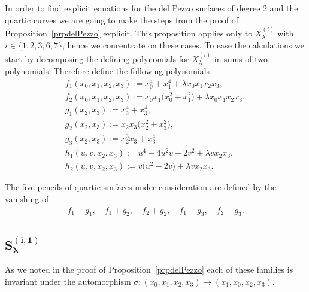 \documentclass[pdftex]{sigma}
\numberwithin{equation}{section}
\begin{document}
In order to f\/ind explicit equations for the del Pezzo surfaces of degree 2 and the quartic curves we are going to make the steps from the proof of Proposition~\ref{prpdelPezzo} explicit. This proposition applies only to $X^{(i)}_{\lambda}$ with $i\in \{1,2,3,6,7\}$, hence we concentrate on these cases. To ease the calculations we start by decomposing the def\/ining polynomials for $X_\lambda^{(i)}$ in sums of two polynomials. Therefore def\/ine the following polynomials
 \begin{gather*} f_1(x_0,x_1,x_2,x_3):=x_0^4+x_1^4+\lambda x_0x_1x_2x_3,\\
 f_2(x_0,x_1,x_2,x_3):=x_0x_1\big(x_0^2+x_1^2\big)+\lambda x_0x_1x_2x_3 ,\\
 g_1(x_2,x_3):=x_2^4+x_3^4, \\
 g_2(x_2,x_3):=x_2x_3\big(x_2^2+x_3^2\big), \\
 g_3(x_2,x_3):=x_2^3x_3+x_3^4,\\
h_1(u,v,x_2,x_3):=u^4-4u^2v+2v^2+\lambda vx_2x_3,\\
h_2(u,v,x_2,x_3):=v\big(u^2-2v\big)+\lambda vx_2x_3.\end{gather*}

The f\/ive pencils of quartic surfaces under consideration are def\/ined by the vanishing of
\begin{gather*} f_1+g_1,\quad f_1+g_2,\quad f_2+g_2, \quad f_1+g_3, \quad f_2+g_3.\end{gather*}

\subsection[$S^{(i,1)}_{\lambda}$]{$\boldsymbol{S^{(i,1)}_{\lambda}}$}
As we noted in the proof of Proposition~\ref{prpdelPezzo} each of these families is invariant under the automorphism $\sigma\colon (x_0,x_1,x_2,x_3)\mapsto (x_1,x_0,x_2,x_3)$.
\end{document}
